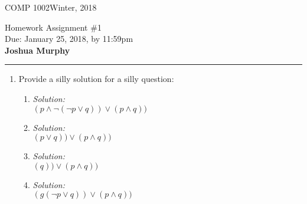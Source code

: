 \documentclass[11pt]{article}
\def\CourseCode{COMP 1002}
\def\AssignmentNo{1}
\def\DateHandedOut{Winter, 2018}
\def\DateDue{January 25, 2018}
\def\TimeDue{11:59pm}
\begin{document}
\noindent
\CourseCode \hfill \DateHandedOut\\

\begin{center}
Homework Assignment \#\AssignmentNo\\
Due: \DateDue, by \TimeDue\\

\textbf{Joshua Murphy} \\
\end{center}
\hrule\smallskip 

\begin{enumerate}
        \item Provide a silly solution for a silly question: 
            \begin{enumerate}
                \item {\em Solution:} \\ $(p \wedge \neg (\neg p \vee q)) \vee (p \wedge q))$
                \item {\em Solution:} \\ $(p \vee q)) \vee (p \wedge q))$
                \item {\em Solution:} \\ $( q)) \vee (p \wedge q))$
                \item {\em Solution:} \\ $(g (\neg p \vee q)) \vee (p \wedge q))$
    \end{enumerate}
\end{enumerate}

\bigskip
\end{document}
